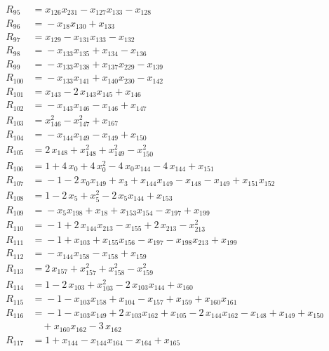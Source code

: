 \begin{align*}
R_{95} &={} x_{126} x_{231} -x_{127} x_{133} -x_{128} \\[2pt]
R_{96} &={} -x_{18} x_{130} +x_{133} \\[2pt]
R_{97} &={} x_{129} -x_{131} x_{133} -x_{132} \\[2pt]
R_{98} &={} -x_{133} x_{135} +x_{134} -x_{136} \\[2pt]
R_{99} &={} -x_{133} x_{138} +x_{137} x_{229} -x_{139} \\[2pt]
R_{100} &={} -x_{133} x_{141} +x_{140} x_{230} -x_{142} \\[2pt]
R_{101} &={} x_{143} -2\,x_{143} x_{145} +x_{146} \\[2pt]
R_{102} &={} -x_{143} x_{146} -x_{146} +x_{147} \\[2pt]
R_{103} &={} x_{146}^{2} -x_{147}^{2} +x_{167} \\[2pt]
R_{104} &={} -x_{144} x_{149} -x_{149} +x_{150} \\[2pt]
R_{105} &={} 2\,x_{148} +x_{148}^{2} +x_{149}^{2} -x_{150}^{2} \\[2pt]
R_{106} &={} 1 +4\,x_{0} +4\,x_{0}^{2} -4\,x_{0} x_{144} -4\,x_{144} +x_{151} \\[2pt]
R_{107} &={} -1 -2\,x_{0} x_{149} +x_{3} +x_{144} x_{149} -x_{148} -x_{149} +x_{151} x_{152} \\[2pt]
R_{108} &={} 1 -2\,x_{5} +x_{5}^{2} -2\,x_{5} x_{144} +x_{153} \\[2pt]
R_{109} &={} -x_{5} x_{198} +x_{18} +x_{153} x_{154} -x_{197} +x_{199} \\[2pt]
R_{110} &={} -1 +2\,x_{144} x_{213} -x_{155} +2\,x_{213} -x_{213}^{2} \\[2pt]
R_{111} &={} -1 +x_{103} +x_{155} x_{156} -x_{197} -x_{198} x_{213} +x_{199} \\[2pt]
R_{112} &={} -x_{144} x_{158} -x_{158} +x_{159} \\[2pt]
R_{113} &={} 2\,x_{157} +x_{157}^{2} +x_{158}^{2} -x_{159}^{2} \\[2pt]
R_{114} &={} 1 -2\,x_{103} +x_{103}^{2} -2\,x_{103} x_{144} +x_{160} \\[2pt]
R_{115} &={} -1 -x_{103} x_{158} +x_{104} -x_{157} +x_{159} +x_{160} x_{161} \\[2pt]
R_{116} &={} -1 -x_{103} x_{149} +2\,x_{103} x_{162} +x_{105} -2\,x_{144} x_{162} -x_{148} +x_{149} +x_{150} \\
&\quad{} +x_{160} x_{162} -3\,x_{162} \\[2pt]
R_{117} &={} 1 +x_{144} -x_{144} x_{164} -x_{164} +x_{165} \\[2pt]

\end{align*}
